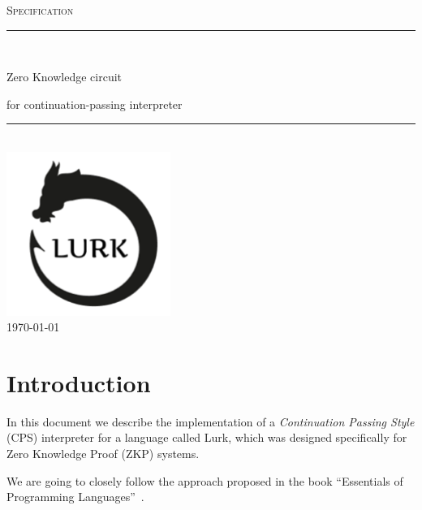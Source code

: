 \documentclass[10pt, english]{article}
\begin{document}
\newcommand{\var}{\mathrm{var}}
\newcommand{\val}{\mathrm{val}}

\begin{titlepage}
	\newcommand{\HRule}{\rule{\linewidth}{0.5mm}}

	\clearpage\thispagestyle{empty}
	\centering
	\vspace{1cm}

	\textsc{\Large Specification}\\[.5cm]
	\HRule\\[.5cm]
	{\Huge Zero Knowledge circuit \par}
	\vspace{.5cm}
	{\Large for continuation-passing interpreter \par}
	\vspace{.5cm}
	\HRule \\[.5cm]


\includegraphics[width=0.4\textwidth,scale=1]{logo.png}\\[.1cm]
	{\large \today}\\[2cm]
\vfill
\end{titlepage}


\begin{abstract}
  \end{abstract}

\tableofcontents

\newpage

\section{Introduction}

In this document we describe the implementation of a \emph{Continuation Passing Style} (CPS) interpreter for a language called Lurk, which was designed specifically for Zero Knowledge Proof (ZKP) systems.

We are going to closely follow the approach proposed in the book ``Essentials of Programming Languages''~\cite{FWbook}.
\end{document}
